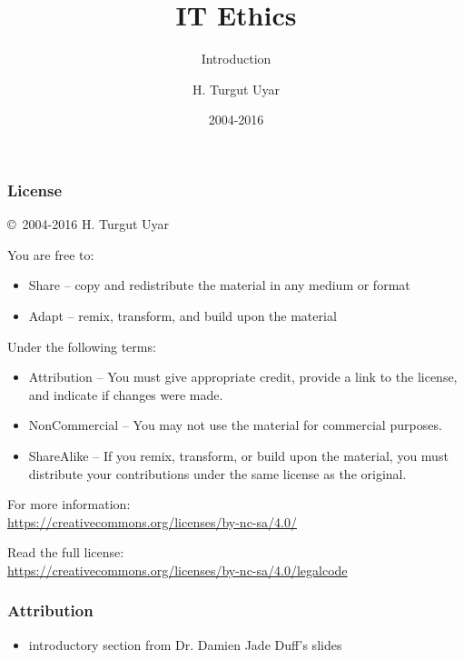 \documentclass[dvipsnames]{beamer}
\title{IT Ethics}
\subtitle{Introduction}
\author{H. Turgut Uyar}
\date{2004-2016}
\begin{document}
\begin{frame}
  \titlepage
\end{frame}

\begin{frame}
  \frametitle{License}

  \hfill
  \copyright~2004-2016 H. Turgut Uyar

  \vfill
  \begin{footnotesize}
    You are free to:
    \begin{itemize}
      \itemsep0em
      \item Share -- copy and redistribute the material in any medium or format
      \item Adapt -- remix, transform, and build upon the material
    \end{itemize}

    Under the following terms:
    \begin{itemize}
      \itemsep0em
      \item Attribution -- You must give appropriate credit, provide a link to
        the license, and indicate if changes were made.

      \item NonCommercial -- You may not use the material for commercial
        purposes.

      \item ShareAlike -- If you remix, transform, or build upon the material,
        you must distribute your contributions under the same license as the
        original.
    \end{itemize}
  \end{footnotesize}

  \begin{small}
    For more information:\\
    \url{https://creativecommons.org/licenses/by-nc-sa/4.0/}

    \smallskip
    Read the full license:\\
    \url{https://creativecommons.org/licenses/by-nc-sa/4.0/legalcode}
  \end{small}
\end{frame}

\begin{frame}
  \frametitle{Attribution}

  \begin{itemize}
    \item introductory section from Dr. Damien Jade Duff's slides
  \end{itemize}
\end{frame}
\end{document}
